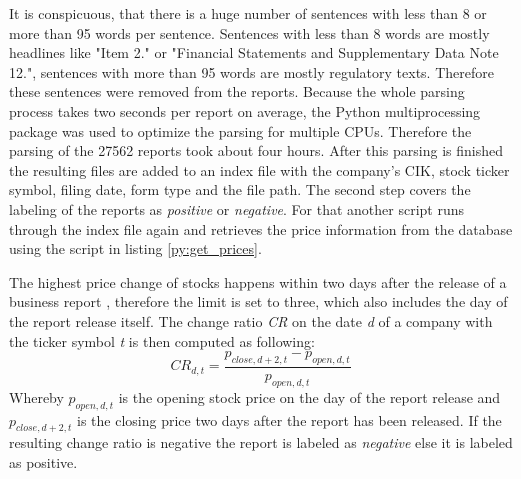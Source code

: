 It is conspicuous, that there is a huge number of sentences with less than 8 or more than 95 words per sentence.
Sentences with less than 8 words are mostly headlines like "Item 2." or "Financial Statements and Supplementary Data Note 12.", sentences with more than 95 words are mostly regulatory texts.
Therefore these sentences were removed from the reports.
Because the whole parsing process takes two seconds per report on average, the Python multiprocessing package was used to optimize the parsing for multiple \acs{CPU}s.
Therefore the parsing of the 27562 reports took about four hours.
After this parsing is finished the resulting files are added to an index file with the company's \ac{CIK}, stock ticker symbol, filing date, form type and the file path.
The second step covers the labeling of the reports as \textit{positive} or \textit{negative}.
For that another script runs through the index file again and retrieves the price information from the database using the script in listing \ref{py:get_prices}.

The highest price change of stocks happens within two days after the release of a business report \cite{Feldman2010}, therefore the limit is set to three, which also includes the day of the report release itself.
The change ratio \textit{CR} on the date \textit{d} of a company with the ticker symbol \textit{t} is then computed as following:
\begin{equation}
    CR_{d,t} = \frac{p_{close, d + 2, t} - p_{open, d, t}}{p_{open, d, t}}
\end{equation}
Whereby $p_{open, d, t}$ is the opening stock price on the day of the report release and $p_{close, d + 2, t}$ is the closing price two days after the report has been released.
If the resulting change ratio is negative the report is labeled as \textit{negative} else it is labeled as positive.

